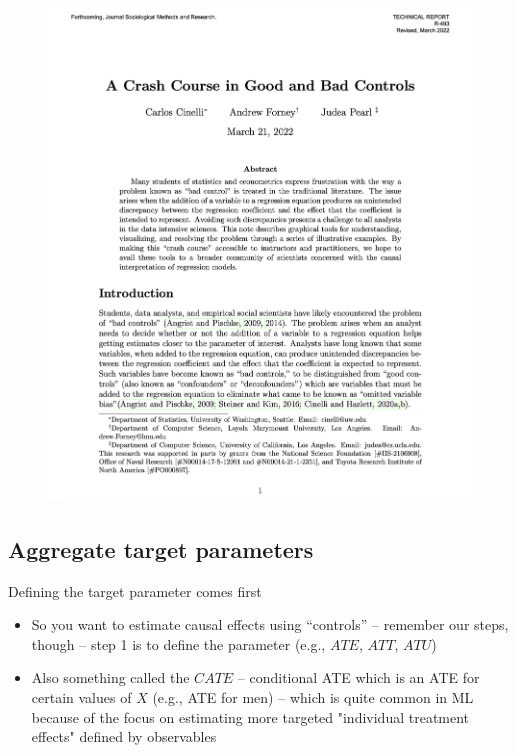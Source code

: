 \documentclass{beamer}
\begin{document}
\begin{frame}{}

  \begin{figure}
    \includegraphics[scale=0.25]{./lecture_includes/crash_course}
  \end{figure}

\end{frame}





\subsection{Aggregate target parameters}


\begin{frame}{Defining the target parameter comes first}

\begin{itemize}
\item So you want to estimate causal effects using ``controls'' -- remember our steps, though -- step 1 is to define the parameter (e.g., $ATE$, $ATT$, $ATU$)
\item Also something called the $CATE$ -- conditional ATE which is an ATE for certain values of $X$ (e.g., ATE for men) -- which is quite common in ML because of the focus on estimating more targeted "individual treatment effects" defined by observables

\end{itemize}

\end{frame}
\end{document}
